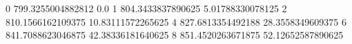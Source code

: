 0 799.3255004882812 0.0
1 804.3433837890625 5.01788330078125
2 810.1566162109375 10.83111572265625
4 827.6813354492188 28.3558349609375
6 841.7088623046875 42.38336181640625
8 851.4520263671875 52.12652587890625

